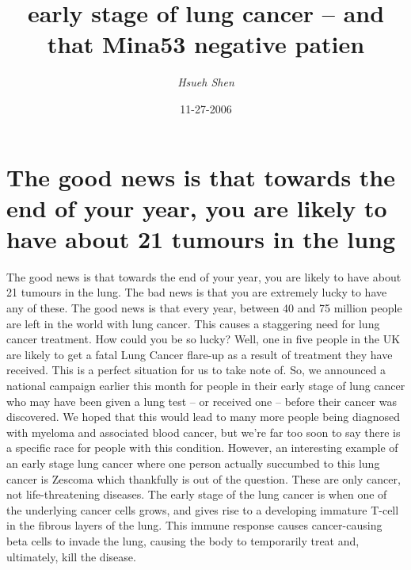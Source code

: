 \documentclass{article}%
\title{early stage of lung cancer – and that Mina53 negative patien}%
\author{\textit{Hsueh Shen}}%
\date{11-27-2006}%
\begin{document}
%
\normalsize%
\maketitle%
\section{The good news is that towards the end of your year, you are likely to have about 21 tumours in the lung}%
\label{sec:Thegoodnewsisthattowardstheendofyouryear,youarelikelytohaveabout21tumoursinthelung}%
The good news is that towards the end of your year, you are likely to have about 21 tumours in the lung.\newline%
The bad news is that you are extremely lucky to have any of these.\newline%
The good news is that every year, between 40 and 75 million people are left in the world with lung cancer. This causes a staggering need for lung cancer treatment.\newline%
How could you be so lucky?\newline%
Well, one in five people in the UK are likely to get a fatal Lung Cancer flare{-}up as a result of treatment they have received.\newline%
This is a perfect situation for us to take note of.\newline%
So, we announced a national campaign earlier this month for people in their early stage of lung cancer who may have been given a lung test – or received one – before their cancer was discovered.\newline%
We hoped that this would lead to many more people being diagnosed with myeloma and associated blood cancer, but we’re far too soon to say there is a specific race for people with this condition.\newline%
However, an interesting example of an early stage lung cancer where one person actually succumbed to this lung cancer is Zescoma which thankfully is out of the question.\newline%
These are only cancer, not life{-}threatening diseases.\newline%
The early stage of the lung cancer is when one of the underlying cancer cells grows, and gives rise to a developing immature T{-}cell in the fibrous layers of the lung.\newline%
This immune response causes cancer{-}causing beta cells to invade the lung, causing the body to temporarily treat and, ultimately, kill the disease.\newline%
\end{document}
